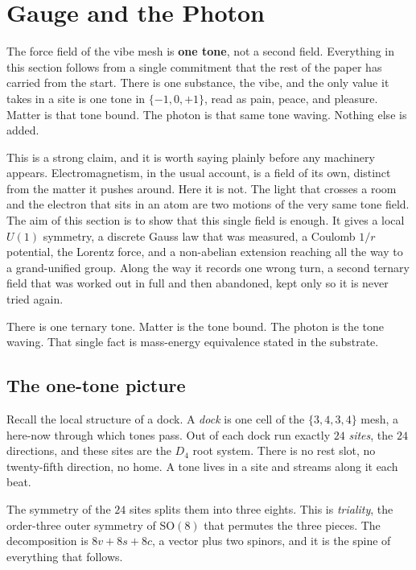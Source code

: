 \section{Gauge and the Photon}

The force field of the vibe mesh is \textbf{one tone}, not a second field. Everything in this section follows from a single commitment that the rest of the paper has carried from the start. There is one substance, the vibe, and the only value it takes in a site is one tone in $\{-1, 0, +1\}$, read as pain, peace, and pleasure. Matter is that tone bound. The photon is that same tone waving. Nothing else is added.

This is a strong claim, and it is worth saying plainly before any machinery appears. Electromagnetism, in the usual account, is a field of its own, distinct from the matter it pushes around. Here it is not. The light that crosses a room and the electron that sits in an atom are two motions of the very same tone field. The aim of this section is to show that this single field is enough. It gives a local $U(1)$ symmetry, a discrete Gauss law that was measured, a Coulomb $1/r$ potential, the Lorentz force, and a non-abelian extension reaching all the way to a grand-unified group. Along the way it records one wrong turn, a second ternary field that was worked out in full and then abandoned, kept only so it is never tried again.

\begin{principle}
There is one ternary tone. Matter is the tone bound. The photon is the tone waving. That single fact is mass-energy equivalence stated in the substrate.
\end{principle}

\subsection{The one-tone picture}

Recall the local structure of a dock. A \emph{dock} is one cell of the $\{3,4,3,4\}$ mesh, a here-now through which tones pass. Out of each dock run exactly $24$ \emph{sites}, the $24$ directions, and these sites are the $D_4$ root system. There is no rest slot, no twenty-fifth direction, no home. A tone lives in a site and streams along it each beat.

The symmetry of the $24$ sites splits them into three eights. This is \emph{triality}, the order-three outer symmetry of $\mathrm{SO}(8)$ that permutes the three pieces. The decomposition is $8v + 8s + 8c$, a vector plus two spinors, and it is the spine of everything that follows.

